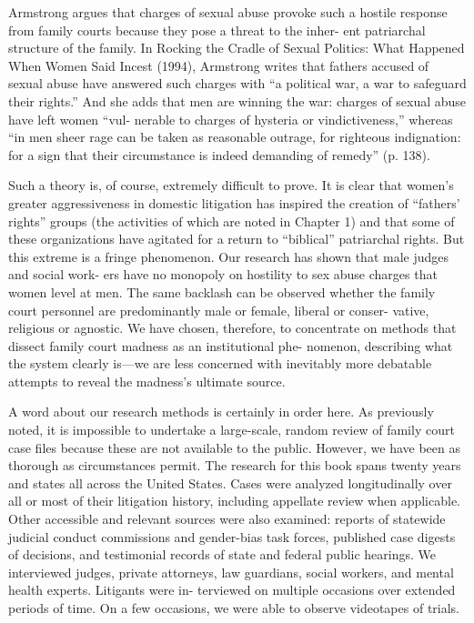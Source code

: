 Armstrong argues that charges of sexual abuse provoke such a hostile
response from family courts because they pose a threat to the inher-
ent patriarchal structure of the family. In Rocking the Cradle of Sexual
Politics: What Happened When Women Said Incest (1994), Armstrong
writes that fathers accused of sexual abuse have answered such charges
with “a political war, a war to safeguard their rights.” And she adds that
men are winning the war: charges of sexual abuse have left women “vul-
nerable to charges of hysteria or vindictiveness,” whereas “in men sheer
rage can be taken as reasonable outrage, for righteous indignation: for a
sign that their circumstance is indeed demanding of remedy” (p. 138). \pfl{}


Such a theory is, of course, extremely difficult to prove. It is clear that
women’s greater aggressiveness in domestic litigation has inspired the
creation of “fathers’ rights” groups (the activities of which are noted
in Chapter 1) and that some of these organizations have agitated for
a return to “biblical” patriarchal rights. But this extreme is a fringe
phenomenon. Our research has shown that male judges and social work-
ers have no monopoly on hostility to sex abuse charges that women
level at men. The same backlash can be observed whether the family
court personnel are predominantly male or female, liberal or conser-
vative, religious or agnostic. We have chosen, therefore, to concentrate
on methods that dissect family court madness as an institutional phe-
nomenon, describing what the system clearly is—we are less concerned
with inevitably more debatable attempts to reveal the madness’s ultimate
source. \pfl{}


A word about our research methods is certainly in order here. As
previously noted, it is impossible to undertake a large-scale, random
review of family court case files because these are not available to the
public. However, we have been as thorough as circumstances permit.
The research for this book spans twenty years and states all across
the United States. Cases were analyzed longitudinally over all or most
of their litigation history, including appellate review when applicable.
Other accessible and relevant sources were also examined: reports of
statewide judicial conduct commissions and gender-bias task forces,
published case digests of decisions, and testimonial records of state and
federal public hearings. We interviewed judges, private attorneys, law
guardians, social workers, and mental health experts. Litigants were in-
terviewed on multiple occasions over extended periods of time. On a
few occasions, we were able to observe videotapes of trials. \pfl{}



